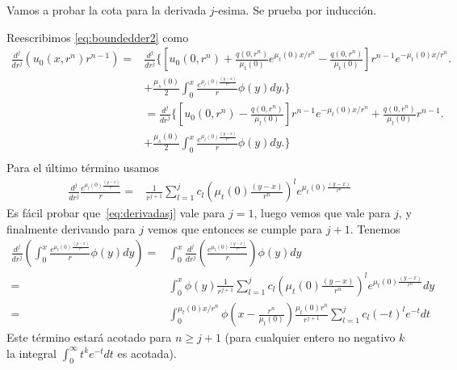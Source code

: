 Vamos a probar la cota para la derivada $j$-esima. Se prueba por inducción. 

Reescribimos \eqref{eq:boundedder2} como
\begin{equation}
\begin{split}
\frac{d^j }{dr^j} \left( u_0(x,r^n) r^{n-1} \right)=&\frac{d^j }{dr^j} \Bigg\{ 
\left[u_0(0,r^n) + \frac{q(0,r^n)}{\mu_t(0)}e^{\mu_t(0)x/r^n}-\frac{q(0,r^n)}{\mu_t(0)} \right]r^{n-1}e^{-\mu_t(0)x/r^n}   \Bigg.\\
&+ \frac{\mu_s(0)}{2} \int_0^{x} \frac{e^{\mu_t(0)\frac{(y-x)}{r^n}}}{r} \phi(y) dy \Bigg. \Bigg\}\\
&=\frac{d^j }{dr^j} \Bigg\{ 
\left[u_0(0,r^n) -\frac{q(0,r^n)}{\mu_t(0)} \right]r^{n-1}e^{-\mu_t(0)x/r^n} + \frac{q(0,r^n)}{\mu_t(0)}r^{n-1}   \Bigg.\\
&+ \frac{\mu_s(0)}{2} \int_0^{x} \frac{e^{\mu_t(0)\frac{(y-x)}{r^n}}}{r} \phi(y) dy \Bigg. \Bigg\}\\
\end{split}
\label{eq:boundedder3b}
\end{equation}
Para el último término usamos
\begin{equation}
\begin{split}
\frac{d^j }{dr^j} \frac{e^{\mu_t(0)\frac{(y-x)}{r^n}}}{r}=&  \frac{1}{r^{j+1}}\sum_{l=1}^j c_l \left( \mu_t(0)\frac{(y-x)}{r^n} \right)^l e^{\mu_t(0)\frac{(y-x)}{r^n}}
\end{split}
\label{eq:derivadasj}
\end{equation}
Es fácil probar que~\eqref{eq:derivadasj} vale para $j=1$, luego vemos que vale para $j$, 
y finalmente derivando para $j$ vemos que entonces se cumple para $j+1$.
Tenemos
\begin{equation}
\begin{split}
\frac{d^j }{dr^j}\left( \int_0^{x} \frac{e^{\mu_t(0)\frac{(y-x)}{r^n}}}{r} \phi(y) dy \right) =& \int_0^{x} \frac{d^j }{dr^j}\left(  \frac{e^{\mu_t(0)\frac{(y-x)}{r^n}}}{r} \right) \phi(y) dy\\
=&\int_0^{x} \phi(y)  \frac{1}{r^{j+1}}\sum_{l=1}^j c_l \left( \mu_t(0)\frac{(y-x)}{r^n} \right)^l e^{\mu_t(0)\frac{(y-x)}{r^n}}dy\\
=&\int_0^{\mu_t(0)x/r^n} \phi\left(x-\frac{r^n}{\mu_t(0)}\right)  \frac{\mu_t(0) r^n}{r^{j+1}}\sum_{l=1}^j c_l \left( -t \right)^l e^{-t}dt
\end{split}
\label{eq:derivadasj2}
\end{equation}
Este término estará acotado para $n\ge j+1$ (para cualquier entero no negativo $k$ 
la integral $\int_0^\infty t^k e^{-t} dt$ es acotada).

